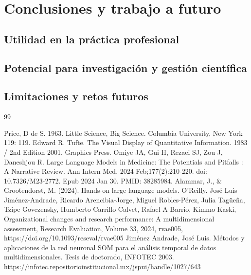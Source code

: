 \documentclass[letterpaper,spanish,12pt]{book}
\begin{document}
\chapter{Conclusiones y trabajo a futuro}
    \section{Utilidad en la práctica profesional}

    

    
    \section{Potencial para investigación y gestión científica}

    
    \section{Limitaciones y retos futuros}

\begin{thebibliography}{99}
 Price, D de S. 1963. Little Science, Big Science. Columbia University, New York 119: 119.
 Edward R. Tufte. The Visual Display of Quantitative Information. 1983 / 2nd Edition 2001. Graphics Press.
 Omiye JA, Gui H, Rezaei SJ, Zou J, Daneshjou R. Large Language Models in Medicine: The Potentials and Pitfalls : A Narrative Review. Ann Intern Med. 2024 Feb;177(2):210-220. doi: 10.7326/M23-2772. Epub 2024 Jan 30. PMID: 38285984.
 Alammar, J., $\&$ Grootendorst, M. (2024). Hands-on large language models. O'Reilly.
 José Luis Jiménez-Andrade, Ricardo Arencibia-Jorge, Miguel Robles-Pérez, Julia Tagüeña, Tzipe Govezensky, Humberto Carrillo-Calvet, Rafael A Barrio, Kimmo Kaski, Organizational changes and research performance: A multidimensional assessment, Research Evaluation, Volume 33, 2024, rvae005, https://doi.org/10.1093/reseval/rvae005
 Jiménez Andrade, José Luis. Métodos y aplicaciones de la red neuronal SOM para el análisis temporal de datos multidimensionales. Tesis de doctorado, INFOTEC 2003. https://infotec.repositorioinstitucional.mx/jspui/handle/1027/643 
\end{thebibliography}

\backmatter
\end{document}
